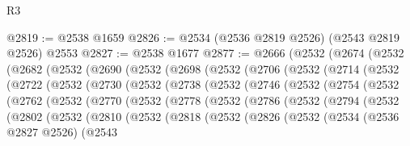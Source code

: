 \begin{lexlean}{R3}
\begin{coremodule}
@2819 := @2538 @1659
@2826 := @2534 (@2536 @2819 @2526) (@2543 @2819 @2526) @2553
@2827 := @2538 @1677
@2877 := @2666
    (@2532
      (@2674
        (@2532
          (@2682
            (@2532
              (@2690
                (@2532
                  (@2698
                    (@2532
                      (@2706
                        (@2532
                          (@2714
                            (@2532
                              (@2722
                                (@2532
                                  (@2730
                                    (@2532
                                      (@2738
                                        (@2532
                                          (@2746
                                            (@2532
                                              (@2754
                                                (@2532
                                                  (@2762
                                                    (@2532
                                                      (@2770
                                                        (@2532
                                                          (@2778
                                                            (@2532
                                                              (@2786
                                                                (@2532
                                                                  (@2794
                                                                    (@2532
                                                                      (@2802
                                                                        (@2532
                                                                          (@2810
                                                                            (@2532
                                                                              (@2818
                                                                                (@2532
                                                                                  (@2826
                                                                                    (@2532
                                                                                      (@2534
                                                                                        (@2536
                                                                                          @2827
                                                                                          @2526)
                                                                                        (@2543

\end{coremodule}
\end{lexlean}
